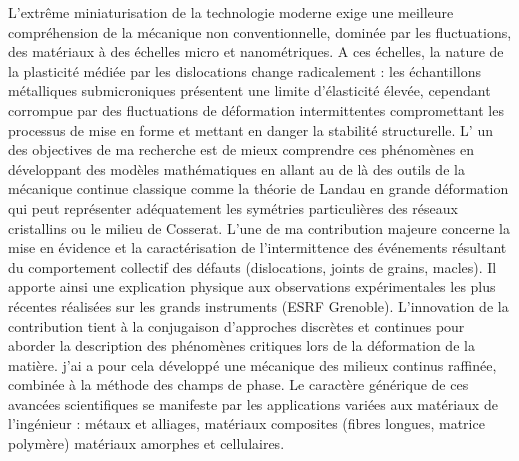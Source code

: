 \documentclass[paper=a4,fontsize=11pt]{temp} %
\begin{document}
L'extrême miniaturisation de la technologie moderne exige une meilleure compréhension de la mécanique non conventionnelle, dominée par les fluctuations, des matériaux à des échelles micro et nanométriques. A ces échelles, la nature de la plasticité médiée par les dislocations change radicalement : les échantillons métalliques submicroniques présentent une limite d'élasticité élevée, cependant corrompue par des fluctuations de déformation intermittentes compromettant les processus de mise en forme et mettant en danger la stabilité structurelle. L' un des objectives  de ma recherche   est de mieux comprendre ces phénomènes en développant des modèles mathématiques en allant  au de là des  outils de la mécanique continue classique comme la  théorie de Landau en grande déformation qui peut représenter adéquatement les symétries particulières des réseaux cristallins ou le milieu de Cosserat. L'une de ma contribution majeure concerne la mise en évidence et la caractérisation de l’intermittence des événements résultant du comportement collectif des défauts (dislocations, joints de grains, macles). Il apporte ainsi une explication physique aux observations expérimentales les plus récentes réalisées sur les grands instruments (ESRF Grenoble). L’innovation de la contribution tient à la conjugaison d’approches discrètes et continues pour aborder la description des phénomènes critiques lors de la déformation de la matière. j'ai a pour cela développé une mécanique des milieux continus raffinée, combinée à la méthode des champs de phase.
Le caractère générique de ces avancées scientifiques se manifeste par les applications variées aux matériaux de l’ingénieur : métaux et alliages, matériaux composites (fibres longues, matrice polymère) matériaux amorphes et cellulaires.
\end{document}
